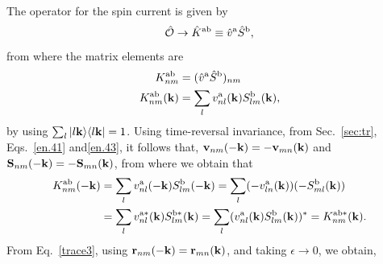 \documentclass[floatfix,prb,aps,superscriptaddress,11pt]{revtex4}
\begin{document}
The operator for the spin current is given by
\begin{align}\label{1.e}
\hat{{\cal O}}\to\hat K^{\mathrm{a}\mathrm{b}}\equiv\hat v^{\mathrm{a}}\hat S^{\mathrm{b}}  
,
\end{align} 
from where the matrix elements are
\begin{align}\label{2.e} 
K^{\mathrm{a}\mathrm{b}}_{nm}
&=(\hat v^{\mathrm{a}}\hat S^{\mathrm{b}})_{nm} 
\nonumber\\ 
K^{\mathrm{a}\mathrm{b}}_{nm}(\mathbf{k})&=\sum_l v^{\mathrm{a}}_{nl}(\mathbf{k}) S^{\mathrm{b}} _{lm} (\mathbf{k})  
,
\end{align} 
by using $\sum_l| l\mathbf{k} \rangle\langle l\mathbf{k} |=1$. Using time-reversal
invariance, from Sec.~\ref{sec:tr}, 
Eqs.~\eqref{en.41} and\eqref{en.43},
it
follows that,
$\mathbf{v}_{nm}(-\mathbf{k})=-\mathbf{v}_{mn}(\mathbf{k})$ and 
$\mathbf{S}_{nm}(-\mathbf{k})=-\mathbf{S}_{mn}(\mathbf{k})$, from where we obtain that 
\begin{align}\label{3.e} 
K^{\mathrm{a}\mathrm{b}}_{nm}(-\mathbf{k}) 
&=\sum_l v^{\mathrm{a}}_{nl}(-\mathbf{k}) S^{\mathrm{b}} _{lm} (-\mathbf{k}) 
=\sum_l (-v^{\mathrm{a}}_{ln}(\mathbf{k}))(- S^{\mathrm{b}} _{ml} (\mathbf{k}) )  
\nonumber\\
&=\sum_l  
v^{\mathrm{a} *}_{nl}(\mathbf{k})  
S^{\mathrm{b} *} _{lm} (\mathbf{k}) 
=\sum_l 
(v^{\mathrm{a}}_{nl}(\mathbf{k})  
S^{\mathrm{b}} _{lm} (\mathbf{k}))^*=K^{\mathrm{a}\mathrm{b} *}_{nm}(\mathbf{k}) 
.  
\end{align} 
From Eq.~\eqref{trace3}, using $\mathbf{r}_{nm}(-\mathbf{k})=\mathbf{r}_{mn}(\mathbf{k})$, and
taking $\epsilon\to 0$, we obtain,
\end{document}
